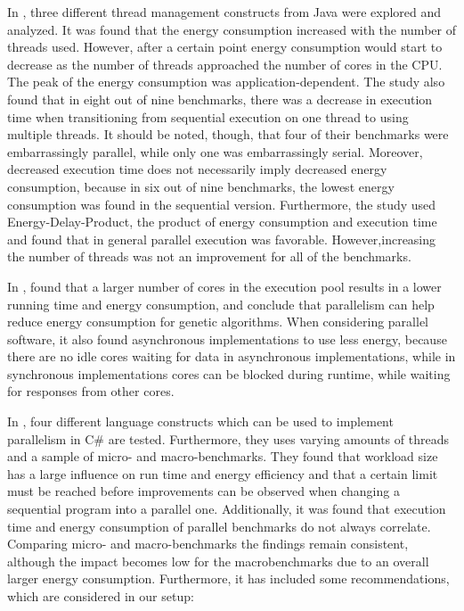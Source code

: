 In \cite{Pinto2014}, three different thread management constructs from Java were explored and analyzed. It was found that the energy consumption increased with the number of threads used. However, after a certain point energy consumption would start to decrease as the number of threads approached the number of cores in the CPU. The peak of the energy consumption was application-dependent. The study also found that in eight out of nine benchmarks, there was a decrease in execution time when transitioning from sequential execution on one thread to using multiple threads. It should be noted, though, that four of their benchmarks were embarrassingly parallel, while only one was embarrassingly serial. Moreover, decreased execution time does not necessarily imply decreased energy consumption, because in six out of nine benchmarks, the lowest energy consumption was found in the sequential version. Furthermore, the study used Energy-Delay-Product, the product of energy consumption and execution time and found that in general parallel execution was favorable. However,increasing the number of threads was not an improvement for all of the benchmarks.\cite{Pinto2014}

In \cite{abdelhafez2019}, found that a larger number of cores in the execution pool results in a lower running time and energy consumption, and conclude that parallelism can help reduce energy consumption for genetic algorithms. %
When considering parallel software, it also found asynchronous implementations to use less energy, because there are no idle cores waiting for data in asynchronous implementations, while in synchronous implementations cores can be blocked during runtime, while waiting for responses from other cores.

In \cite{Lindholt2022}, %
four different language constructs which can be used to implement parallelism in C\# are tested. Furthermore, they uses varying amounts of threads and a sample of micro- and macro-benchmarks. They found that workload size has a large influence on run time and energy efficiency and that a certain limit must be reached before improvements can be observed when changing a sequential program into a parallel one. Additionally, it was found that execution time and energy consumption of parallel benchmarks do not always correlate. Comparing micro- and macro-benchmarks the findings remain consistent, although the impact becomes low for the macrobenchmarks due to an overall larger energy consumption. Furthermore, it has included some recommendations, which are considered in our setup:\cite{Lindholt2022}

